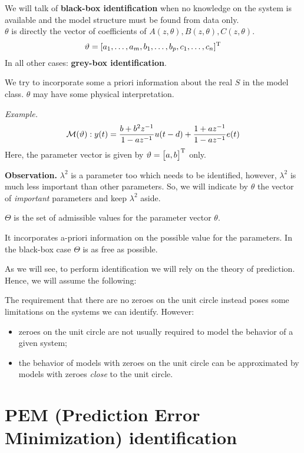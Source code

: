 We will talk of \textbf{black-box identification} when no knowledge on the system is available and the model structure must be found from data only.\\
$\theta$ is directly the vector of coefficients of $A(z, \theta),B(z, \theta),C(z, \theta)$.
$$
	\vartheta=[a_{1},\ldots,a_{m},b_{1},\ldots,b_{p},c_{1},\ldots,c_{n}]^{\mathrm{T}}
$$
In all other cases: \textbf{grey-box identification}.

We try to incorporate some a priori information about the real $S$ in the model class. $\theta$ may have some physical interpretation.

\emph{Example.}
$$
	\mathcal{M}(\vartheta): y(t)=\frac{b+b^{2} z^{-1}}{1-a z^{-1}} u(t-d)+\frac{1+a z^{-1}}{1-a z^{-1}} e(t)
$$
Here, the parameter vector is given by $\vartheta=\begin{bmatrix}a,b\end{bmatrix}^{\mathrm{T}}$ only.


\textbf{Observation.}
$\lambda^2$ is a parameter too which needs to be identified, however, $\lambda^2$ is much less important than other parameters. So, we will indicate by $\theta$ the vector of \emph{important} parameters and keep $\lambda^2$ aside.

$\Theta$ is the set of admissible values for the parameter vector $\theta$.

It incorporates a-priori information on the possible value for the parameters. In the black-box case $\Theta$ is as free as possible.

As we will see, to perform identification we will rely on the theory of prediction. Hence, we will assume the following:


The requirement that there are no zeroes on the unit circle instead poses some limitations on the systems we can identify. However:
\begin{itemize}
	\item zeroes on the unit circle are not usually required to model the behavior of a given system;
	\item the behavior of models with zeroes on the unit circle can be approximated by models with zeroes \emph{close} to the unit circle.
\end{itemize} 

\section{PEM (Prediction Error Minimization) identification}

